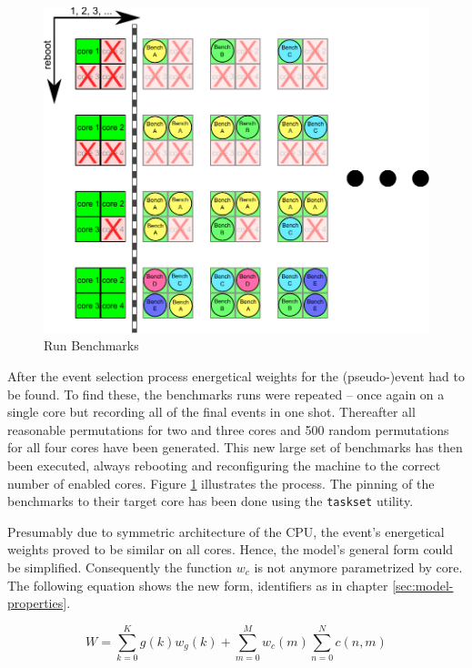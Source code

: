 \begin{figure}
  \centering
    \includegraphics[width=\textwidth]{fig/run-benchmarks.pdf}
  \caption{Run Benchmarks}
  \label{fig:run-benchmarks}
\end{figure}

After the event selection process energetical weights for the (pseudo-)event had
to be found. To find these, the benchmarks runs were repeated -- once again on
a single core but recording all of the final events in one shot. Thereafter all
reasonable permutations for two and three cores and 500 random permutations for
all four cores have been generated.  This new large set of benchmarks has then
been executed, always rebooting and reconfiguring the machine to the correct
number of enabled cores. Figure \ref{fig:run-benchmarks} illustrates the
process. The pinning of the benchmarks to their target core has been done using
the \texttt{taskset} utility.

Presumably due to symmetric architecture of the CPU, the event's energetical
weights proved to be similar on all cores. Hence, the model's general form could
be simplified. Consequently the function $w_c$ is not anymore parametrized by
core. The following equation shows the new form, identifiers as in chapter
\ref{sec:model-properties}.

\begin{equation}
W = \sum\limits_{k=0}^K g(k) w_g(k) +
\sum\limits_{m=0}^M  w_c(m) \sum\limits_{n=0}^N c(n, m)
\end{equation}

